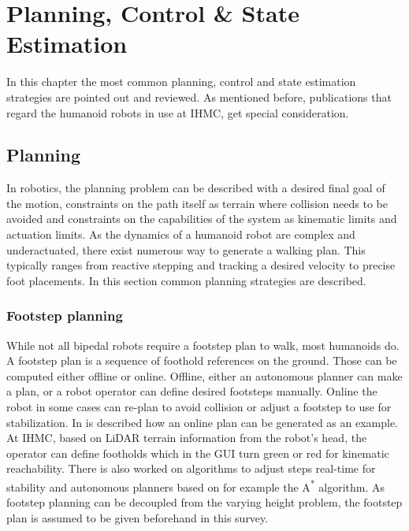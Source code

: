 %
\chapter{Planning, Control \& State Estimation}%
\label{chap:planningcontrol}
In this chapter the most common planning, control and state estimation strategies are pointed out and reviewed. As mentioned before, publications that regard the humanoid robots in use at IHMC, get special consideration.

\section{Planning}
In robotics, the planning problem can be described with a desired final goal of the motion, constraints on the path itself as terrain where collision needs to be avoided and constraints on the capabilities of the system as kinematic limits and actuation limits. As the dynamics of a humanoid robot are complex and underactuated, there exist numerous way to generate a walking plan. This typically ranges from reactive stepping and tracking a desired velocity to precise foot placements. In this section common planning strategies are described.

\subsection{Footstep planning}
While not all bipedal robots require a footstep plan to walk, most humanoids do. A footstep plan is a sequence of foothold references on the ground. Those can be computed either offline or online. Offline, either an autonomous planner can make a plan, or a robot operator can define desired footsteps manually. Online the robot in some cases can re-plan to avoid collision or adjust a footstep to use for stabilization. In \cite{chestnutt2005footstep} is described how an online plan can be generated as an example. At IHMC, based on LiDAR terrain information from the robot's head, the operator can define footholds which in the \ac{GUI} turn green or red for kinematic reachability. There is also worked on algorithms to adjust steps real-time for stability \cite{griffin2017walking} and autonomous planners based on for example the A\textsuperscript{*} algorithm. As footstep planning can be decoupled from the varying height problem, the footstep plan is assumed to be given beforehand in this survey.

